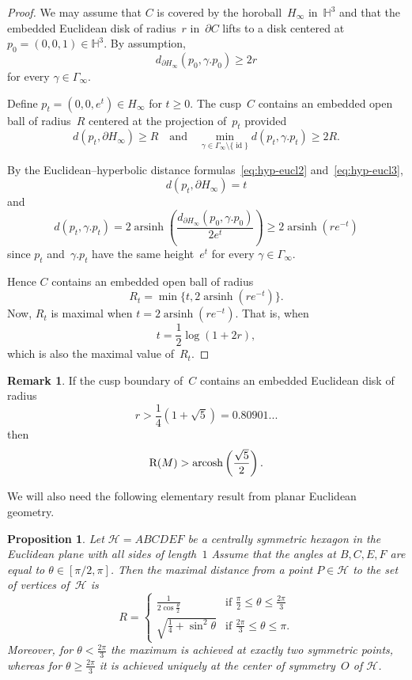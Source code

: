 \documentclass[11pt,reqno]{amsart}
\newtheorem{proposition}[theorem]{Proposition}
\theoremstyle{definition}
\newtheorem{remark}[theorem]{Remark}
\numberwithin{equation}{section}
\newcommand{\HH}{{\mathbb H}}
\newcommand\RR{{\rm R}}
\DeclareMathOperator{\arsinh}{arsinh}
\DeclareMathOperator{\arcosh}{arcosh}
\DeclareMathOperator{\id}{id}
\numberwithin{equation}{section}
\begin{document}
\begin{proof}
We may assume that $C$ is covered by the horoball~$H_\infty$ in~$\HH^3$ and that the embedded Euclidean disk of radius~$r$ in~$\partial C$ lifts to a disk centered at $p_0=(0,0,1) \in \HH^3$.
By assumption, 
\[
d_{\partial H_\infty}(p_0,\gamma.p_0) \geq 2r
\]
for every $\gamma \in \Gamma_\infty$.

Define $p_t=(0,0,e^t) \in H_\infty$ for $t \geq 0$.
The cusp~$C$ contains an embedded open ball of radius~$R$ centered at the projection of~$p_t$ provided
\[
d(p_t,\partial H_\infty) \geq R \quad \text{and} \quad \min_{\gamma \in \Gamma_\infty \setminus \{ \id \}} d(p_t,\gamma.p_t) \geq 2R.
\]

By the Euclidean--hyperbolic distance formulas~\eqref{eq:hyp-eucl2} and~\eqref{eq:hyp-eucl3},
\[
d(p_t,\partial H_\infty) = t
\]
and 
\[
d(p_t,\gamma.p_t) = 2 \arsinh \left( \frac{d_{\partial H_\infty}(p_0,\gamma.p_0)}{2 e^t} \right) \geq 2 \arsinh(r e^{-t})
\]
since $p_t$ and~$\gamma.p_t$ have the same height~$e^t$ for every $\gamma \in \Gamma_\infty$.

Hence $C$ contains an embedded open ball of radius
\[
R_t = \min \{ t, 2 \arsinh(r e^{-t}) \}.
\]
Now, $R_t$ is maximal when $t = 2 \arsinh(r e^{-t})$.
That is, when 
\[
t=\frac{1}{2} \log(1+2r),
\]
which is also the maximal value of~$R_t$.
\end{proof}

\begin{remark} \label{rem:final}
If the cusp boundary of~$C$ contains an embedded Euclidean disk of radius
\[
r>\frac{1}{4} \left( 1+\sqrt{5} \right) = 0.80901...
\]
then 
\[
\RR(M) > \arcosh \left( \frac{\sqrt{5}}{2} \right).
\]
\end{remark}

We will also need the following elementary result from planar Euclidean geometry.

\begin{proposition} \label{prop:hexagon}
Let $\mathcal{H}=ABCDEF$ be a centrally symmetric hexagon in the Euclidean plane with all sides of length~$1$
Assume that the angles at $B,C,E,F$ are equal to $\theta \in [\pi/2,\pi]$. 
Then the maximal distance from a point $P \in \mathcal{H}$ to the set of vertices of~$\mathcal{H}$ is
\[
R=
\begin{cases}
\frac{1}{2\cos \frac{\theta}{2}} & \text{if } \frac{\pi}{2} \leq \theta \leq \frac{2\pi}{3} \\
\sqrt{\frac{1}{4}+\sin^2 \theta} & \text{if } \frac{2\pi}{3} \leq \theta \leq \pi.
\end{cases}
\]
Moreover, for $\theta<\frac{2\pi}{3}$ the maximum is achieved at exactly two symmetric points, whereas for $\theta \geq \frac{2\pi}{3}$ it is achieved uniquely at the center of symmetry~$O$ of $\mathcal{H}$.
\end{proposition}
\end{document}
